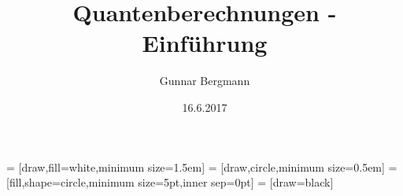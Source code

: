\usepackage{tikz} 
\usetikzlibrary{backgrounds,fit,decorations.pathreplacing, positioning, calc}

\newcommand{\qreg}[1]{\ensuremath{\left|#1\right\rangle}}
\newcommand{\qregfun}[2]{\qreg{#1} \rightarrow \qreg{#2}}
\newcommand{\qregv}[2]{#1_{#2} |#2\rangle}


 = [draw,fill=white,minimum size=1.5em] 
 = [draw,circle,minimum size=0.5em]  %
 = [fill,shape=circle,minimum size=5pt,inner sep=0pt]
 = [draw=black]
\DeclareMathOperator{\NOT}{NOT}
\DeclareMathOperator{\CNOT}{CNOT}

\title{Quantenberechnungen - Einführung}
\author{Gunnar Bergmann}
\date{16.6.2017}

\newcommand{\pictureDeutschAlgo}{
    \begin{tikzpicture}
        \node[left] at (0,0) (q1) {\qreg 0};
        \node[left] at (0,-1) (q2) { \qreg 1 };
        \node[operator, right=of q1] (h11) {$H$} edge [-] (q1);
        \node[operator, right=of q2] (h12) {$H$} edge [-] (q2);

        \node[right, right=of h11] (uf11)  {$x$}     edge [-] (h11);
        \node[right, right=of h12] (uf12)  {$y$}    edge [-] (h12);
        \node[right=5em of uf11, left] (uf21)  {$x$};
        \node[right=5em of uf12, left] (uf22)   {$y \oplus f(x)$};

        \node (text) at ($(uf22)!0.5!(uf11)$) {$U_f$};

        \node[operator, right=of uf12] (h21) at (5,0) {$H$} edge [-] (uf21);
        \node[right] (out1) at (8,0) {} edge [-] (h21);
        \node[right] (out2) at (8,-1) {} edge [-] (uf22);

        \begin{pgfonlayer}{background} 
        \node[surround] (background) [fit = (uf11) (uf12) (uf21)] {};
        \end{pgfonlayer}
    \end{tikzpicture}
    }

\newcommand{\pictureCNOTa}{
      \begin{tikzpicture}
        \node[left] at (0,0) (q1) {\qreg{\psi}};
        \node[left] at (0,-1) (q2) {\qreg{\varphi}};
        \node[phase] (phase11) at (1,0) {} edge [-] (q1);
        \node[operator] (phase12) at (1,-1) {$X$} edge [-] (q2);
        \draw[-] (phase11) -- (phase12);
        \node[right] (out1) at (2,0) {\qreg{\psi}} edge [-] (phase11);
        \node[right] (out2) at (2,-1) {$\qreg{\varphi} \oplus \qreg{\psi}$} edge [-] (phase12);
    \end{tikzpicture}
    }


